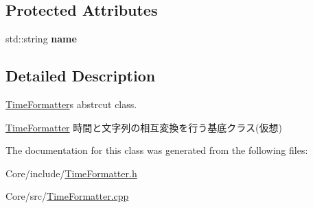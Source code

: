 \subsection*{Protected Attributes}
\begin{DoxyCompactItemize}
\item 
\hypertarget{classskl_1_1_time_formatter_a1a26b7ebf9f1a3e47942afecda7d3571}{}\label{classskl_1_1_time_formatter_a1a26b7ebf9f1a3e47942afecda7d3571} 
std\+::string {\bfseries name}
\end{DoxyCompactItemize}


\subsection{Detailed Description}
\hyperlink{classskl_1_1_time_formatter}{Time\+Formatter}\textquotesingle{}s abstrcut class. 

\hyperlink{classskl_1_1_time_formatter}{Time\+Formatter} 時間と文字列の相互変換を行う基底クラス(仮想) 

The documentation for this class was generated from the following files\+:\begin{DoxyCompactItemize}
\item 
Core/include/\hyperlink{_time_formatter_8h}{Time\+Formatter.\+h}\item 
Core/src/\hyperlink{_time_formatter_8cpp}{Time\+Formatter.\+cpp}\end{DoxyCompactItemize}
